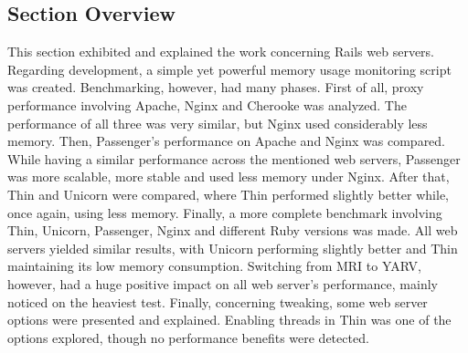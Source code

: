\subsection{Section Overview}
This section exhibited and explained the work concerning Rails web servers. Regarding development, a simple yet powerful memory usage monitoring script was created. Benchmarking, however, had many phases. First of all, proxy performance involving Apache, Nginx and Cherooke was analyzed. The performance of all three was very similar, but Nginx used considerably less memory. Then, Passenger's performance on Apache and Nginx was compared. While having a similar performance across the mentioned web servers, Passenger was more scalable, more stable and used less memory under Nginx. After that, Thin and Unicorn were compared, where Thin performed slightly better while, once again, using less memory. Finally, a more complete benchmark involving Thin, Unicorn, Passenger, Nginx and different Ruby versions was made. All web servers yielded similar results, with Unicorn performing slightly better and Thin maintaining its low memory consumption. Switching from MRI to YARV, however, had a huge positive impact on all web server's performance, mainly noticed on the heaviest test. Finally, concerning tweaking, some web server options were presented and explained. Enabling threads in Thin was one of the options explored, though no performance benefits were detected.

